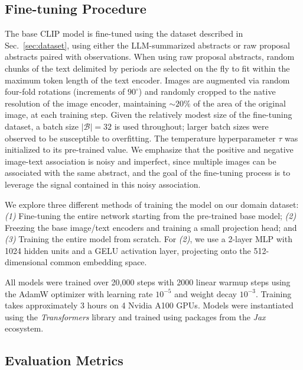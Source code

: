 \documentclass[10pt]{article} %
\newcommand{\package}[1]{\textsl{#1}\xspace}
\begin{document}
\subsection{Fine-tuning Procedure}

The base CLIP model is fine-tuned using the dataset described in Sec.~\ref{sec:dataset}, using either the LLM-summarized abstracts or raw proposal abstracts paired with observations.
%
When using raw proposal abstracts, random chunks of the text delimited by periods are selected on the fly to fit within the maximum token length of the text encoder.
%
Images are augmented via random four-fold rotations (increments of $90^\circ$) and randomly cropped to the native resolution of the image encoder, maintaining $\sim 20\%$ of the area of the original image, at each training step.
%
Given the relatively modest size of the fine-tuning dataset, a batch size $|\mathcal B| = 32$ is used throughout; larger batch sizes were observed to be susceptible to overfitting.
%
The temperature hyperparameter $\tau$ was initialized to its pre-trained value.
%
We emphasize that the positive and negative image-text association is noisy and imperfect, since multiple images can be associated with the same abstract, and the goal of the fine-tuning process is to leverage the signal contained in this noisy association. 

We explore three different methods of training the model on our domain dataset: \emph{(1)} Fine-tuning the entire network starting from the pre-trained base model; \emph{(2)} Freezing the base image/text encoders and training a small projection head; and \emph{(3)} Training the entire model from scratch.
%
For \emph{(2)}, we use a 2-layer MLP with 1024 hidden units and a GELU activation layer, projecting onto the 512-dimensional common embedding space.

All models were trained over 20,000 steps with 2000 linear warmup steps 
using the AdamW optimizer \citep{DBLP:conf/iclr/LoshchilovH19,DBLP:journals/corr/KingmaB14} with  %
learning rate $10^{-5}$ and weight decay $10^{-3}$.
%
Training takes approximately 3 hours on 4 Nvidia A100 GPUs.
Models were instantiated using the \package{Transformers} \citep{wolf2019huggingface} library and trained using packages from the \package{Jax} \citep{jax2018github} ecosystem.
%

\subsection{Evaluation Metrics}
\label{sec:eval}
\end{document}
